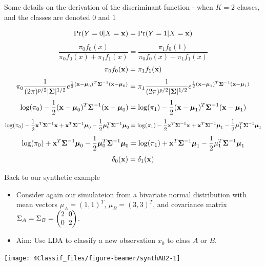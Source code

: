 \documentclass[10pt,ignorenonframetext,]{beamer}
\begin{document}
\begin{frame}

Some details on the derivation of the discriminant function - when
\(K=2\) classes, and the classes are denoted \(0\) and \(1\)

\[\text{Pr}(Y=0 | X={\bf x}) = \text{Pr}(Y=1 | X={\bf x})\]
\[\frac{\pi_0f_0(x)}{\pi_0f_0(x)+\pi_1f_1(x)} = \frac{\pi_1f_0(1)}{\pi_0f_0(x)+\pi_1f_1(x)} \]
\[\pi_0 f_0({\bf x}) = \pi_1 f_1({\bf x})\]
\[\pi_0\frac{1}{(2 \pi)^{p/2}|\boldsymbol{\Sigma}|^{1/2}}
e^{\frac{1}{2}({\bf x}-\boldsymbol{\mu}_0)^T \boldsymbol{\Sigma}^{-1}({\bf x}-\boldsymbol{\mu}_0)} =  \pi_1\frac{1}{(2 \pi)^{p/2}|\boldsymbol{\Sigma}|^{1/2}}e^{\frac{1}{2}({\bf x}-\boldsymbol{\mu}_1)^T \boldsymbol{\Sigma}^{-1}({\bf x}-\boldsymbol{\mu}_1)} \]
\[\log(\pi_0) -\frac{1}{2}({\bf x}-\boldsymbol{\mu}_0)^T \boldsymbol{\Sigma}^{-1}({\bf x}-\boldsymbol{\mu}_0) = 
\log(\pi_1) -\frac{1}{2}({\bf x}-\boldsymbol{\mu}_1)^T \boldsymbol{\Sigma}^{-1}({\bf x}-\boldsymbol{\mu}_1) \]
\[\log(\pi_0)  -\frac{1}{2}{\bf x}^T\boldsymbol{\Sigma}^{-1}{\bf x} + {\bf x}^T\boldsymbol{\Sigma}^{-1}\boldsymbol{\mu}_0 - \frac{1}{2}\boldsymbol{\mu}_0^T\boldsymbol{\Sigma}^{-1}\boldsymbol{\mu}_0 = \log(\pi_1)  -\frac{1}{2}{\bf x}^T\boldsymbol{\Sigma}^{-1}{\bf x} + {\bf x}^T\boldsymbol{\Sigma}^{-1}\boldsymbol{\mu}_1 - \frac{1}{2}\boldsymbol{\mu}_1^T\boldsymbol{\Sigma}^{-1}\boldsymbol{\mu}_1 \]
\[\log(\pi_0) + {\bf x}^T\boldsymbol{\Sigma}^{-1}\boldsymbol{\mu}_0 - \frac{1}{2}\boldsymbol{\mu}_0^T\boldsymbol{\Sigma}^{-1}\boldsymbol{\mu}_0 = 
\log(\pi_1) + {\bf x}^T\boldsymbol{\Sigma}^{-1}\boldsymbol{\mu}_1 - \frac{1}{2}\mu_1^T\boldsymbol{\Sigma}^{-1}\boldsymbol{\mu}_1\]
\[\delta_0({\bf x}) = \delta_1({\bf x}) \]

\end{frame}

\begin{frame}

\begin{block}{Back to our synthetic example}

\begin{itemize}
\item
  Consider again our simulateion from a bivariate normal distribution
  with mean vectors \(\mu_A = (1, 1)^T\), \(\mu_B = (3, 3)^T\), and
  covariance matrix
  \(\Sigma_A = \Sigma_B = \begin{pmatrix} 2\hspace{2mm} 0 \\ 0 \hspace{2mm} 2 \end{pmatrix}\).
\item
  Aim: Use LDA to classify a new observation \(x_0\) to class \(A\) or
  \(B\).
\end{itemize}

\begin{center}\texttt{[image: 4Classif\_files/figure-beamer/synthAB2-1]} \end{center}

\end{block}

\end{frame}
\end{document}
